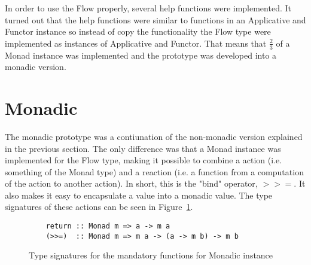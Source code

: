 In order to use the Flow properly, several help functions were implemented. It turned out that the help functions were similar to functions in an Applicative and Functor instance so instead of copy the functionality the Flow type were implemented as instances of Applicative and Functor. That means that \(\frac{2}{3}\) of a Monad instance was implemented and the prototype was developed into a monadic version.
\section{Monadic}
The monadic prototype was a contiunation of the non-monadic version explained in the previous section. The only difference was that a Monad instance was implemented for the Flow type, making it possible to combine a action (i.e. something of the Monad type) and a reaction (i.e. a function from a computation of the action to another action). In short, this is the "bind" operator, \(>>=\). It also makes it easy to encapsulate a value into a monadic value. The type signatures of these actions can be seen in Figure~\ref{fig:monadic_actions}. 
\begin{figure}[h]
  \lstset{language=Haskell}
  \begin{lstlisting}
    return :: Monad m => a -> m a
    (>>=)  :: Monad m => m a -> (a -> m b) -> m b
  \end{lstlisting}
  \caption{Type signatures for the mandatory functions for Monadic instance}
  \label{fig:monadic_actions}
\end{figure}

